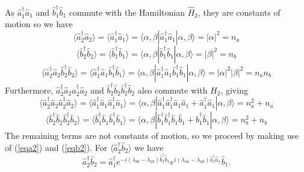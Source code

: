 \documentclass{iopart}
\begin{document}
As $\hat{a}^{\dagger}_1 \hat{a}_1$ and $\hat{b}^{\dagger}_1 \hat{b}_1$ commute with the Hamiltonian $\hat{H}_2$, they are constants of motion so we have
\begin{equation}
\langle \hat{a}^{\dagger}_2 \hat{a}_2 \rangle = \langle \hat{a}^{\dagger}_1 \hat{a}_1 \rangle = \langle \alpha, \beta | \hat{a}^{\dagger}_1 \hat{a}_1 |\alpha, \beta \rangle = |\alpha|^2 = n_a
\end{equation}
%
\begin{equation}
\langle \hat{b}^{\dagger}_2 \hat{b}_2 \rangle = \langle \hat{b}^{\dagger}_1 \hat{b}_1 \rangle = \langle \alpha, \beta | \hat{b}^{\dagger}_1 \hat{b}_1 |\alpha, \beta \rangle = |\beta|^2 = n_b
\end{equation}
%
\begin{equation}
\langle \hat{a}^{\dagger}_2 \hat{a}_2 \hat{b}^{\dagger}_2 \hat{b}_2 \rangle = \langle \hat{a}^{\dagger}_1 \hat{a}_1 \hat{b}^{\dagger}_1 \hat{b}_1 \rangle = \langle \alpha, \beta | \hat{a}^{\dagger}_1 \hat{a}_1 \hat{b}^{\dagger}_1 \hat{b}_1 |\alpha, \beta \rangle = |\alpha|^2 |\beta|^2 = n_a n_b
\end{equation}
Furthermore, $\hat{a}^{\dagger}_2 \hat{a}_2 \hat{a}^{\dagger}_2 \hat{a}_2$ and $\hat{b}^{\dagger}_2 \hat{b}_2 \hat{b}^{\dagger}_2 \hat{b}_2$ also commute with $H_2$, giving
\begin{equation}
\langle \hat{a}^{\dagger}_2 \hat{a}_2 \hat{a}^{\dagger}_2 \hat{a}_2 \rangle = \langle \hat{a}^{\dagger}_1 \hat{a}_1 \hat{a}^{\dagger}_1 \hat{a}_1 \rangle = \langle \alpha, \beta | \hat{a}^{\dagger}_1 \hat{a}^{\dagger}_1 \hat{a}_1 \hat{a}_1 + \hat{a}^{\dagger}_1 \hat{a}_1 |\alpha, \beta \rangle = n_a^2 + n_a
\end{equation}
%
\begin{equation}
\langle \hat{b}^{\dagger}_2 \hat{b}_2 \hat{b}^{\dagger}_2 \hat{b}_2 \rangle = \langle \hat{b}^{\dagger}_1 \hat{b}_1 \hat{b}^{\dagger}_1 \hat{b}_1 \rangle = \langle \alpha, \beta | \hat{b}^{\dagger}_1 \hat{b}^{\dagger}_1 \hat{b}_1 \hat{b}_1 + \hat{b}^{\dagger}_1 \hat{b}_1 |\alpha, \beta \rangle = n_b^2 + n_b
\end{equation}
The remaining terms are not constants of motion, so we proceed by making use of (\ref{eqa2}) and (\ref{eqb2}). For $\langle \hat{a}^{\dagger}_2 \hat{b}_2 \rangle$ we have
\begin{equation}
\hat{a}^{\dagger}_2 \hat{b}_2 = \hat{a}^{\dagger}_1 e^{-i (\lambda_{bb} - \lambda_{ab}) \hat{b}^{\dagger}_1 \hat{b}_1} e^{i (\lambda_{aa} - \lambda_{ab}) \hat{a}^{\dagger}_1 \hat{a}_1} \hat{b}_1. 
\end{equation}
\end{document}
